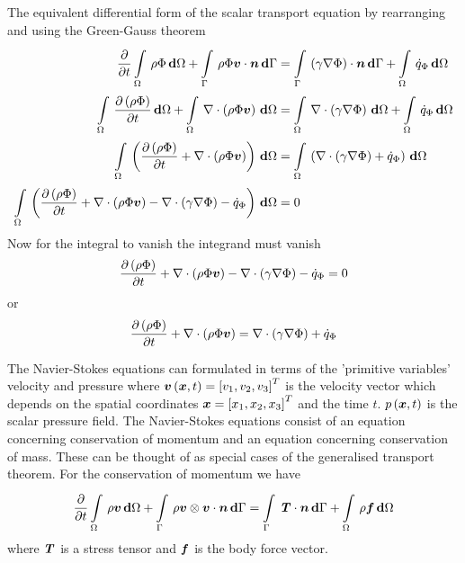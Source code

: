 The equivalent differential form of the scalar transport equation by
rearranging  and using the Green-Gauss
theorem \ie
\begin{equation}
  \begin{split}
    \delby{}{t}\gint{\Omega}{}{\rho\Phi}{\Omega}+\gint{\Gamma}{}{\dotprod{\rho\Phi\vectr{v}}{\vectr{n}}}{\Gamma}
    &=\gint{\Gamma}{}{\dotprod{\pbrac{\gamma\gradient{}{\Phi}}}{\vectr{n}}}{\Gamma}+\gint{\Omega}{}{\dot{q}_{\Phi}}{\Omega}\\
    \gint{\Omega}{}{\delby{\pbrac{\rho\Phi}}{t}}{\Omega}+\gint{\Omega}{}{\divergence{}{\pbrac{\rho\Phi\vectr{v}}}}{\Omega}
    &=\gint{\Omega}{}{\divergence{}{\pbrac{\gamma\gradient{}{\Phi}}}}{\Omega}+\gint{\Omega}{}{\dot{q}_{\Phi}}{\Omega}
    \\
    \gint{\Omega}{}{\pbrac{\delby{\pbrac{\rho\Phi}}{t}+\divergence{}{\pbrac{\rho\Phi\vectr{v}}}}}{\Omega}
    &=\gint{\Omega}{}{\pbrac{\divergence{}{\pbrac{\gamma\gradient{}{\Phi}}}+\dot{q}_{\Phi}}}{\Omega}
    \\
    \gint{\Omega}{}{\pbrac{\delby{\pbrac{\rho\Phi}}{t}+\divergence{}{\pbrac{\rho\Phi\vectr{v}}}-
        \divergence{}{\pbrac{\gamma\gradient{}{\Phi}}}-\dot{q}_{\Phi}}}{\Omega}
    &= 0
  \end{split}
\end{equation}
Now for the integral to vanish the integrand must vanish \ie
\begin{equation}
  \delby{\pbrac{\rho\Phi}}{t}+\divergence{}{\pbrac{\rho\Phi\vectr{v}}}
  -\divergence{}{\pbrac{\gamma\gradient{}{\Phi}}}-\dot{q}_{\Phi}=0
\end{equation}
or
\begin{equation}
  \delby{\pbrac{\rho\Phi}}{t}+\divergence{}{\pbrac{\rho\Phi\vectr{v}}}=\divergence{}{\pbrac{\gamma\gradient{}{\Phi}}}+\dot{q}_{\Phi}
  \label{eqn:differentialgenscalartransport}
\end{equation}

The Navier-Stokes equations can formulated in terms of the 'primitive
variables' \ie velocity and pressure where
$ \boldsymbol{v}\left( \boldsymbol{x},t \right) ={\left[ v_{1},v_{2},v_{3} \right]}^{T}$ is the
velocity vector which depends on the spatial coordinates
$\boldsymbol{x}={\left[ x_{1},x_{2},x_{3} \right]}^{T}$ and the time
$t$. $ p\left( \boldsymbol{x},t \right) $ is the scalar pressure field. The Navier-Stokes
equations consist of an equation concerning conservation of momentum and an
equation concerning conservation of mass. These can be thought of as special
cases of the generalised transport theorem. For the conservation of momentum
we have
\begin{equation}
   \dfrac{\partial }{\partial t}   \displaystyle\int\limits_{\Omega}^{} \,\rho\boldsymbol{v}\, \boldsymbol{\mathrm{d}} \Omega 
  +  \displaystyle\int\limits_{\Gamma}^{} \, \rho\boldsymbol{v} \otimes \boldsymbol{v} \cdot\boldsymbol{n}\, \boldsymbol{\mathrm{d}} \Gamma 
  =  \displaystyle\int\limits_{\Gamma}^{} \,\boldsymbol{\mathit{T}}\cdot\boldsymbol{n}\, \boldsymbol{\mathrm{d}} \Gamma +  \displaystyle\int\limits_{\Omega}^{} \,\rho\boldsymbol{f}\, \boldsymbol{\mathrm{d}} \Omega 
\end{equation}
where $\boldsymbol{\mathit{T}}$ is a stress tensor and $\boldsymbol{f}$ is the body force
vector.

